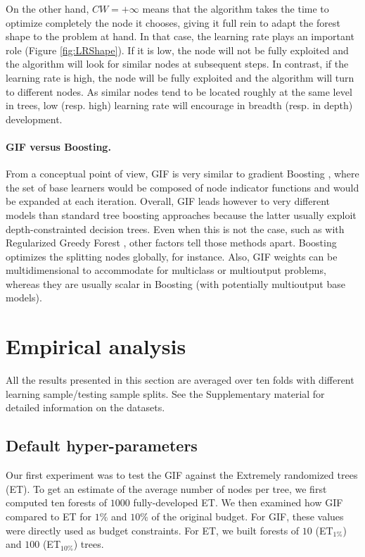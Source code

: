 \documentclass{article}
\begin{document}
On the other hand, $CW=+\infty$ means that the algorithm takes the
time to optimize completely the node it chooses, giving it full rein
to adapt the forest shape to the problem at hand. In that case, the
learning rate plays an important role (Figure \ref{fig:LRShape}). If
it is low, the node will not be fully exploited and the algorithm will
look for similar nodes at subsequent steps.  In contrast, if the
learning rate is high, the node will be fully exploited and the
algorithm will turn to different nodes.  As similar nodes tend to be
located roughly at the same level in trees, low (resp. high) learning
rate will encourage in breadth (resp. in depth) development.


\paragraph{GIF versus Boosting.}
From a conceptual point of view, GIF is very similar to gradient Boosting
\cite{friedman2001gradboost}, where the set of base learners would be composed 
of node indicator functions and would be expanded at each iteration. Overall, 
GIF leads however to very different models than standard tree boosting 
approaches because the latter usually exploit depth-constrainted decision 
trees. Even when this is not the case, such as with Regularized Greedy Forest 
\cite{johnson2014regforest}, other factors tell those methods apart. Boosting 
optimizes the splitting nodes globally, for instance. Also, GIF weights can be 
multidimensional to accommodate for multiclass or multioutput problems, whereas 
they are usually scalar in Boosting (with potentially multioutput base models).




\section{Empirical analysis}
\label{sec:analysis}

All the results presented in this section are averaged over ten folds
with different learning sample/testing sample splits. See the Supplementary 
material for detailed information on the datasets.

\subsection{Default hyper-parameters}
\label{subsec:defaultHP}

Our first experiment was to test the GIF against the Extremely randomized trees 
(ET).
To get an estimate of the average number of nodes per tree, we first 
computed ten forests of $1000$ fully-developed ET. We then examined how GIF 
compared to ET for $1\%$ and $10\%$ of the original budget. For GIF, these 
values were directly used as budget constraints. For ET, we built forests of 
$10$ (ET$_{1\%}$) and $100$ (ET$_{10\%}$) trees. 
\end{document}
